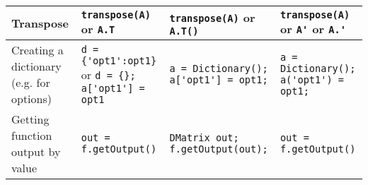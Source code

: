 \documentclass[a4paper,12pt]{book}
\begin{document}
\begin{center}
\begin{tabular}{| p{3.5cm} | p{3.5cm} | p{3.5cm} | p{3.5cm} | }
    Transpose & \verb|transpose(A)| or \verb|A.T| & \verb|transpose(A)| or \verb|A.T()|& \verb|transpose(A)| or \verb|A'| or \verb|A.'| \\ \hline
    Creating a dictionary (e.g. for options) & \verb|d = {'opt1':opt1}| or \verb|d = {}; a['opt1'] = opt1| & \verb|a = Dictionary();| \verb|a['opt1'] = opt1;| & \verb|a = Dictionary();| \verb|a('opt1') = opt1;| \\ \hline
    Getting function output by value & \verb|out = f.getOutput()| & \verb|DMatrix out;| \verb|f.getOutput(out);| & \verb|out = f.getOutput()| \\ \hline
  \end{tabular}
\end{center}

%
%
\end{document}
